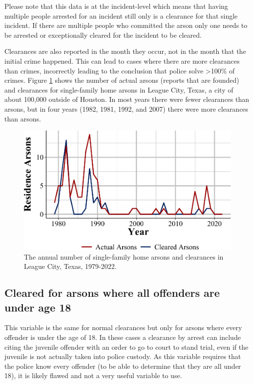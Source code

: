 \documentclass[
  12pt,
  openany]{book}
\begin{document}
Please note that this data is at the incident-level which means that having multiple people arrested for an incident still only is a clearance for that single incident. If there are multiple people who committed the arson only one needs to be arrested or exceptionally cleared for the incident to be cleared.

Clearances are also reported in the month they occur, not in the month that the initial crime happened. This can lead to cases where there are more clearances than crimes, incorrectly leading to the conclusion that police solve \textgreater100\% of crimes. Figure \ref{fig:arsonClearance} shows the number of actual arsons (reports that are founded) and clearances for single-family home arsons in League City, Texas, a city of about 100,000 outside of Houston. In most years there were fewer clearances than arsons, but in four years (1982, 1981, 1992, and 2007) there were more clearances than arsons.

\begin{figure}

{\centering \includegraphics[width=0.9\linewidth]{08_arson_files/figure-latex/arsonClearance-1} 

}

\caption{The annual number of single-family home arsons and clearances in League City, Texas, 1979-2022.}\label{fig:arsonClearance}
\end{figure}

\subsection{Cleared for arsons where all offenders are under age 18}\label{cleared-for-arsons-where-all-offenders-are-under-age-18}

This variable is the same for normal clearances but only for arsons where every offender is under the age of 18. In these cases a clearance by arrest can include citing the juvenile offender with an order to go to court to stand trial, even if the juvenile is not actually taken into police custody. As this variable requires that the police know every offender (to be able to determine that they are all under 18), it is likely flawed and not a very useful variable to use.
\end{document}
